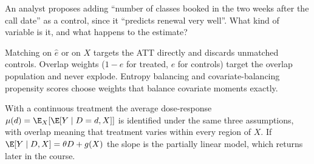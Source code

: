 \documentclass[11pt]{article}
\begin{document}
\begin{exercise}[judgment]
An analyst proposes adding ``number of classes booked in the two weeks after the call date'' as a control, since it ``predicts
renewal very well''. What kind of variable is it, and what happens to the estimate?
\end{exercise}

\sectionthree

\begin{extension}
Matching on $\hat e$ or on $X$ targets the ATT directly and discards unmatched controls. Overlap weights ($1 - e$ for treated, $e$ for
controls) target the overlap population and never explode. Entropy balancing and covariate-balancing propensity scores choose weights
that balance covariate moments exactly.
\end{extension}

\begin{extension}
With a continuous treatment the average dose-response $\mu(d) = \E_X[\E[Y \mid D=d, X]]$ is identified under the same three assumptions,
with overlap meaning that treatment varies within every region of $X$. If $\E[Y \mid D, X] = \theta D + g(X)$ the slope is the partially linear
model, which returns later in the course.
\end{extension}
\end{document}
